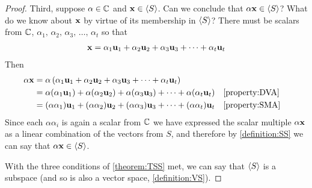 \documentclass{ximera}
\begin{document}
\begin{theorem}
\begin{proof}
    Third, suppose $\alpha\in\mathbb{C}$ and $\mathbf{x}\in\left\langle S\right\rangle$.
    Can we conclude that $\alpha\mathbf{x}\in\left\langle S\right\rangle$?  What do we know
    about $\mathbf{x}$ by virtue of its membership in $\left\langle S\right\rangle$?  There
    must be scalars from $\mathbb{C}$,
    $\alpha_1,\,\alpha_2,\,\alpha_3,\,\ldots,\,\alpha_t$ so that
    \begin{align*}
      \mathbf{x}&=\alpha_{1}\mathbf{u}_{1}+\alpha_{2}\mathbf{u}_{2}+\alpha_{3}\mathbf{u}_{3}+\cdots +\alpha_{t}\mathbf{u}_{t}\\
    \end{align*}
    Then
    \begin{align*}
      \alpha\mathbf{x}&=\alpha\left(\alpha_{1}\mathbf{u}_{1}+\alpha_{2}\mathbf{u}_{2}+\alpha_{3}\mathbf{u}_{3}+\cdots +\alpha_{t}\mathbf{u}_{t}\right)\\
                    &=\alpha(\alpha_1\mathbf{u}_1)+\alpha(\alpha_2\mathbf{u}_2)+\alpha(\alpha_3\mathbf{u}_3)+\cdots+\alpha(\alpha_t\mathbf{u}_t)&&\ref{property:DVA}\\
                    &=(\alpha\alpha_1)\mathbf{u}_1+(\alpha\alpha_2)\mathbf{u}_2+(\alpha\alpha_3)\mathbf{u}_3+\cdots+(\alpha\alpha_t)\mathbf{u}_t&&\ref{property:SMA}\\
    \end{align*}
    Since each $\alpha\alpha_i$ is again a scalar from $\mathbb{C}$ we
    have expressed the scalar multiple $\alpha\mathbf{x}$ as a linear
    combination of the vectors from $S$, and therefore by
    \ref{definition:SS} we can say that $\alpha\mathbf{x}\in\left\langle S\right\rangle$.

    With the three conditions of \ref{theorem:TSS} met, we can say
    that $\left\langle S\right\rangle$ is a subspace (and so is also a vector space,
    \ref{definition:VS}).
  \end{proof}
\end{theorem}
\end{document}
